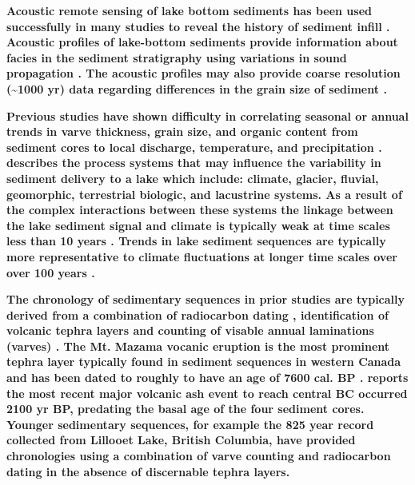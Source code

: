 \documentclass[Royal,times,doublespace,sageh]{sagej}
\begin{document}
\textbf{Acoustic remote sensing of lake bottom sediments has been used
successfully in many studies to reveal the history of sediment infill
\citep{Desloges1994d, Hodder2006b, Gilbert2012, VanRensbergen1999}.
Acoustic profiles of lake-bottom sediments provide information about
facies in the sediment stratigraphy using variations in sound
propagation \citep{LeBlanc1992}. The acoustic profiles may also provide
coarse resolution (\textasciitilde1000 yr) data regarding differences in
the grain size of sediment \citep[e.g.~strong acoustic reflectors
correlated to an energetic sedimentary environment in][]{Hodder2006b}.}

\textbf{Previous studies have shown difficulty in correlating seasonal
or annual trends in varve thickness, grain size, and organic content
from sediment cores to local discharge, temperature, and precipitation
\citep{Hodder2007c, Menounos2008c, Heideman2017}. \citet{Hodder2007c}
describes the process systems that may influence the variability in
sediment delivery to a lake which include: climate, glacier, fluvial,
geomorphic, terrestrial biologic, and lacustrine systems. As a result of
the complex interactions between these systems the linkage between the
lake sediment signal and climate is typically weak at time scales less
than 10 years \citep{Hodder2007c, Menounos2008c, Heideman2017}. Trends
in lake sediment sequences are typically more representative to climate
fluctuations at longer time scales over over 100 years
\citep{Leonard1999, Osborn2007, Heideman2017}. }

\textbf{The chronology of sedimentary sequences in prior studies are
typically derived from a combination of radiocarbon dating
\citep{Gilbert2012, Hodder2006b, Steinman2019}, identification of
volcanic tephra layers \citep{Gilbert2012, Hodder2006b, Steinman2019}
and counting of visable annual laminations (varves)
\citep{Hodder2006b, Heideman2015}. The Mt. Mazama vocanic eruption is
the most prominent tephra layer typically found in sediment sequences in
western Canada \citep{Gilbert2012, Steinman2019} and has been dated to
roughly to have an age of 7600 cal. BP
\citep{Zdanowicz1999, Hallett1997}. \citet{Westgate1977} reports the
most recent major volcanic ash event to reach central BC occurred 2100
yr BP, predating the basal age of the four sediment cores. Younger
sedimentary sequences, for example the 825 year record collected from
Lillooet Lake, British Columbia, have provided chronologies using a
combination of varve counting and radiocarbon dating in the absence of
discernable tephra layers.}
\end{document}
